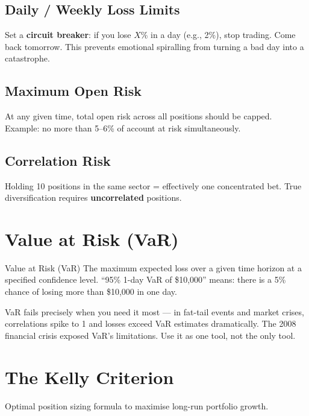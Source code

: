\subsection{Daily / Weekly Loss Limits}
Set a \textbf{circuit breaker}: if you lose $X$\% in a day (e.g., 2\%), stop trading.
Come back tomorrow. This prevents emotional spiralling from turning a bad day into a catastrophe.

\subsection{Maximum Open Risk}
At any given time, total open risk across all positions should be capped. Example:
no more than 5--6\% of account at risk simultaneously.

\subsection{Correlation Risk}
Holding 10 positions in the same sector = effectively one concentrated bet.
True diversification requires \textbf{uncorrelated} positions.

\section{Value at Risk (VaR)}

\begin{keyterm}{Value at Risk (VaR)}
The maximum expected loss over a given time horizon at a specified confidence level.
``95\% 1-day VaR of \$10{,}000'' means: there is a 5\% chance of losing more than
\$10{,}000 in one day.
\end{keyterm}

\begin{warningbox}
VaR fails precisely when you need it most — in fat-tail events and market crises,
correlations spike to 1 and losses exceed VaR estimates dramatically.
The 2008 financial crisis exposed VaR's limitations. Use it as one tool, not the only tool.
\end{warningbox}

\section{The Kelly Criterion}

Optimal position sizing formula to maximise long-run portfolio growth.

